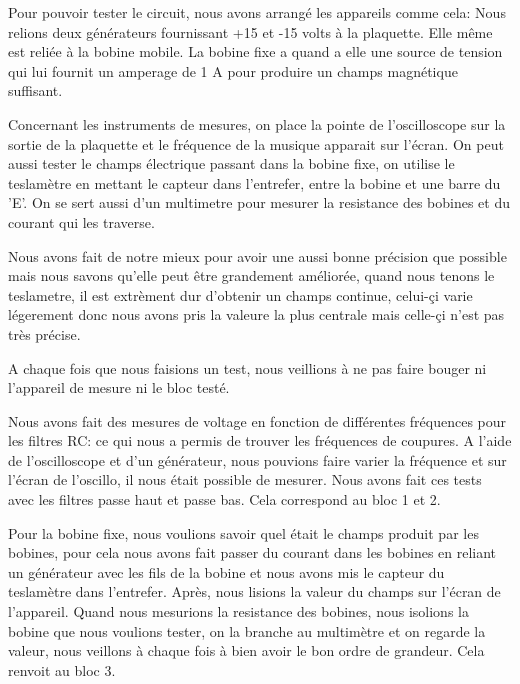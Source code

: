 

Pour pouvoir tester le circuit, nous avons arrangé les appareils comme cela: Nous relions deux générateurs fournissant +15 et 
-15 volts à la plaquette.  Elle même est reliée à la bobine mobile.  La bobine fixe a quand a elle une source de tension qui 
lui fournit un amperage de 1 A pour produire un champs magnétique suffisant.

Concernant les instruments de mesures, on place la pointe de l'oscilloscope sur la sortie de la plaquette et le fréquence
de la musique apparait sur l'écran.  On peut aussi tester le champs électrique passant dans la bobine fixe, on utilise le
teslamètre en mettant le capteur dans l'entrefer, entre la bobine et une barre du 'E'.  On se sert aussi d'un multimetre
pour mesurer la resistance des bobines et du courant qui les traverse.

Nous avons fait de notre mieux pour avoir une aussi bonne précision que possible mais nous savons qu'elle peut être grandement
améliorée, quand nous tenons le teslametre, il est extrèment dur d'obtenir un champs continue, celui-çi varie légerement donc
nous avons pris la valeure la plus centrale mais celle-çi n'est pas très précise.

A chaque fois que nous faisions un test, nous veillions à ne pas faire bouger ni l'appareil de mesure ni le bloc testé.

Nous avons fait des mesures de voltage en fonction de différentes fréquences pour les filtres RC: ce qui nous a permis
de trouver les fréquences de coupures. A l'aide de l'oscilloscope et d'un générateur, nous pouvions faire varier
la fréquence et sur l'écran de l'oscillo, il nous était possible de mesurer.  Nous avons fait ces tests avec les filtres passe haut et passe bas.  Cela correspond 
au bloc 1 et 2.

Pour la bobine fixe, nous voulions savoir quel était le champs produit par les bobines, pour cela nous avons fait passer
du courant dans les bobines en reliant un générateur avec les fils de la bobine et nous avons mis le capteur du teslamètre 
dans l'entrefer.  Après, nous lisions la valeur du champs sur l'écran de l'appareil.
Quand nous mesurions la resistance des bobines, nous isolions la bobine que nous voulions tester, on la branche au multimètre
et on regarde la valeur, nous veillons à chaque fois à bien avoir le bon ordre de grandeur. Cela renvoit au bloc 3.

